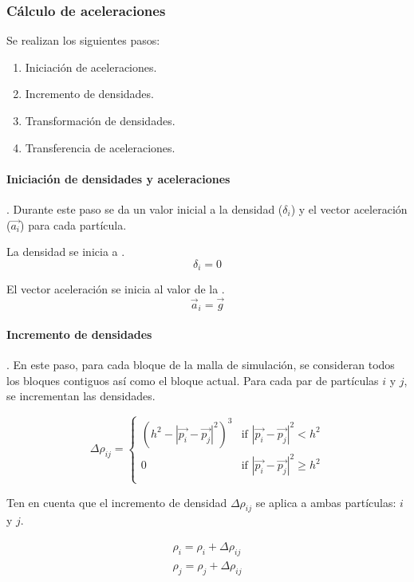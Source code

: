 \subsubsection{Cálculo de aceleraciones}

Se realizan los siguientes pasos:

\begin{enumerate}
\item Iniciación de aceleraciones.
\item Incremento de densidades.
\item Transformación de densidades.
\item Transferencia de aceleraciones.
\end{enumerate}

\paragraph{Iniciación de densidades y aceleraciones}.
Durante este paso se da un valor inicial a la densidad ($\delta_i$)
y el vector aceleración ($\vec{a_i}$) para cada partícula.

La densidad se inicia a .
\[
\delta_i = 0
\]

El vector aceleración se inicia al valor de la .
\[
\vec{a}_i = \vec{g}
\]

\paragraph{Incremento de densidades}.
En este paso, para cada bloque de la malla de simulación, se consideran todos 
los bloques contiguos así como el bloque actual. Para cada par de partículas
$i$ y $j$, se incrementan las densidades.

\[
\Delta \rho_{ij} = 
    \begin{cases}
      (h^2 - |\vec{p_i} - \vec{p_j}|^2)^3 & 
          \text{if  } |\vec{p_i} - \vec{p_j}|^2 < h^2\\
      0 & 
          \text{if  } |\vec{p_i} - \vec{p_j}|^2 \geq h^2\\
    \end{cases}
\]

Ten en cuenta que el incremento de densidad $\Delta \rho_{ij}$ se aplica a ambas
partículas: $i$ y $j$.

\[
\begin{split}
\rho_i = \rho_i + \Delta \rho_{ij}\\
\rho_j = \rho_j + \Delta \rho_{ij}\\
\end{split}
\]


